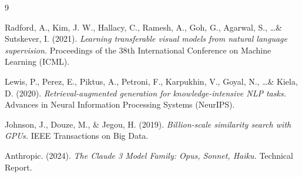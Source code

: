 \documentclass[11pt]{article}
\begin{document}

\begin{thebibliography}{9}

Radford, A., Kim, J. W., Hallacy, C., Ramesh, A., Goh, G., Agarwal, S., \ldots \& Sutskever, I. (2021).
\textit{Learning transferable visual models from natural language supervision.}
Proceedings of the 38th International Conference on Machine Learning (ICML).

Lewis, P., Perez, E., Piktus, A., Petroni, F., Karpukhin, V., Goyal, N., \ldots \& Kiela, D. (2020).
\textit{Retrieval-augmented generation for knowledge-intensive NLP tasks.}
Advances in Neural Information Processing Systems (NeurIPS).

Johnson, J., Douze, M., \& Jegou, H. (2019).
\textit{Billion-scale similarity search with GPUs.}
IEEE Transactions on Big Data.

Anthropic. (2024).
\textit{The Claude 3 Model Family: Opus, Sonnet, Haiku.}
Technical Report.

\end{thebibliography}
\end{document}
